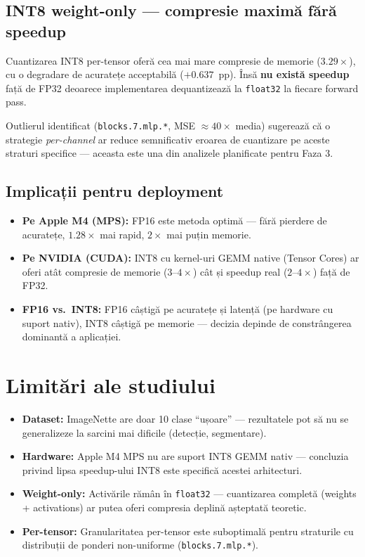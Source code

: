 \documentclass[12pt,a4paper]{article}
\begin{document}
\subsection{INT8 weight-only --- compresie maximă fără speedup}

Cuantizarea INT8 per-tensor oferă cea mai mare compresie de memorie ($3.29\times$),
cu o degradare de acuratețe acceptabilă ($+0.637$~pp). Însă \textbf{nu există speedup}
față de FP32 deoarece implementarea dequantizează la \texttt{float32} la fiecare
forward pass.

Outlierul identificat (\texttt{blocks.7.mlp.*}, MSE $\approx 40\times$ media)
sugerează că o strategie \emph{per-channel} ar reduce semnificativ eroarea de
cuantizare pe aceste straturi specifice --- aceasta este una din analizele planificate
pentru Faza 3.

\subsection{Implicații pentru deployment}

\begin{itemize}
  \item \textbf{Pe Apple M4 (MPS):} FP16 este metoda optimă --- fără pierdere de
    acuratețe, $1.28\times$ mai rapid, $2\times$ mai puțin memorie.
  \item \textbf{Pe NVIDIA (CUDA):} INT8 cu kernel-uri GEMM native (Tensor Cores)
    ar oferi atât compresie de memorie ($3\text{--}4\times$) cât și speedup real
    ($2\text{--}4\times$) față de FP32.
  \item \textbf{FP16 vs.\ INT8:} FP16 câștigă pe acuratețe și latență (pe hardware
    cu suport nativ), INT8 câștigă pe memorie --- decizia depinde de constrângerea
    dominantă a aplicației.
\end{itemize}

\section{Limitări ale studiului}

\begin{itemize}
  \item \textbf{Dataset:} ImageNette are doar 10 clase ``ușoare'' --- rezultatele
    pot să nu se generalizeze la sarcini mai dificile (detecție, segmentare).
  \item \textbf{Hardware:} Apple M4 MPS nu are suport INT8 GEMM nativ --- concluzia
    privind lipsa speedup-ului INT8 este specifică acestei arhitecturi.
  \item \textbf{Weight-only:} Activările rămân în \texttt{float32} --- cuantizarea
    completă (weights + activations) ar putea oferi compresia deplină așteptată teoretic.
  \item \textbf{Per-tensor:} Granularitatea per-tensor este suboptimală pentru
    straturile cu distribuții de ponderi non-uniforme (\texttt{blocks.7.mlp.*}).
\end{itemize}
\end{document}
